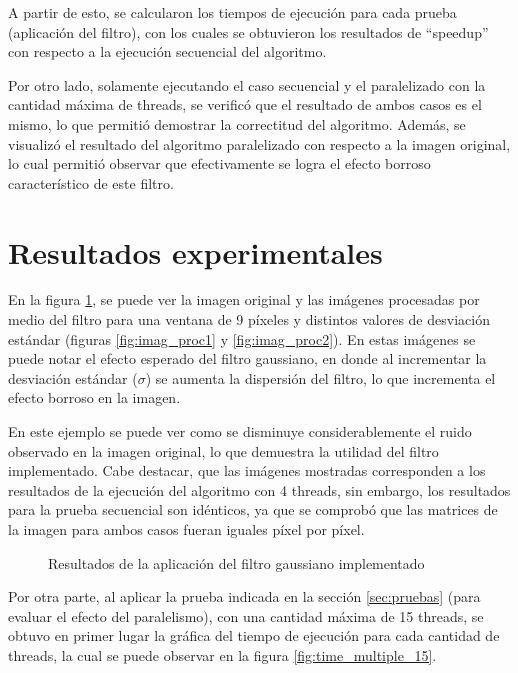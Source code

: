 \documentclass {article}
\begin{document}
A partir de esto, se calcularon los tiempos de ejecución para cada prueba (aplicación del filtro),
con los cuales se obtuvieron los resultados de ``speedup'' con respecto a la ejecución secuencial
del algoritmo.

Por otro lado, solamente ejecutando el caso secuencial y el paralelizado con la cantidad máxima de
threads, se verificó que el resultado de ambos casos es el mismo, lo que permitió demostrar la
correctitud del algoritmo. Además, se visualizó el resultado del algoritmo paralelizado con respecto
a la imagen original, lo cual permitió observar que efectivamente se logra el efecto borroso
característico de este filtro.

\section{Resultados experimentales}

En la figura \ref{fig:result_filtro}, se puede ver la imagen original y las imágenes procesadas por
medio del filtro para una ventana de 9 píxeles y distintos valores de desviación estándar (figuras
\ref{fig:imag_proc1} y \ref{fig:imag_proc2}). En estas imágenes se puede notar el efecto esperado
del filtro gaussiano, en donde al incrementar la desviación estándar ($\sigma$) se aumenta la
dispersión del filtro, lo que incrementa el efecto borroso en la imagen.

En este ejemplo se puede ver como se disminuye considerablemente el ruido observado en la imagen
original, lo que demuestra la utilidad del filtro implementado. Cabe destacar, que las imágenes
mostradas corresponden a los resultados de la ejecución del algoritmo con 4 threads, sin embargo,
los resultados para la prueba secuencial son idénticos, ya que se comprobó que las matrices de la
imagen para ambos casos fueran iguales píxel por píxel.

\begin{figure}[H]
  \centering
  \caption{\label{fig:result_filtro}Resultados de la aplicación del filtro gaussiano implementado}
\end{figure}


Por otra parte, al aplicar la prueba indicada en la sección \ref{sec:pruebas} (para evaluar el
efecto del paralelismo), con una cantidad máxima de 15 threads, se obtuvo en primer lugar la gráfica
del tiempo de ejecución para cada cantidad de threads, la cual se puede observar en la figura
\ref{fig:time_multiple_15}.
\end{document}
